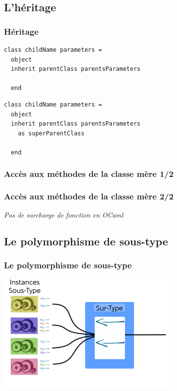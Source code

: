 \subsection{L'héritage} %
\begin{frame}[fragile]
	\frametitle{Héritage}
	\begin{lstlisting}
class childName parameters =
  object
  inherit parentClass parentsParameters

  end
	\end{lstlisting}
	\begin{lstlisting}
class childName parameters =
  object
  inherit parentClass parentsParameters
    as superParentClass

  end
	\end{lstlisting}
\end{frame}

\begin{frame}
	\frametitle{Accès aux méthodes de la classe mère 1/2}
	
\end{frame}

\begin{frame}
	\frametitle{Accès aux méthodes de la classe mère 2/2}
	\textit{Pas de surcharge de fonction en OCaml}
	
\end{frame}
\subsection{Le polymorphisme de sous-type} %
\begin{frame}
	\frametitle{Le polymorphisme de sous-type}
	\begin{center}
		\includegraphics[width=9cm]{pics/inclusionObjet.png}
	\end{center}
\end{frame}

